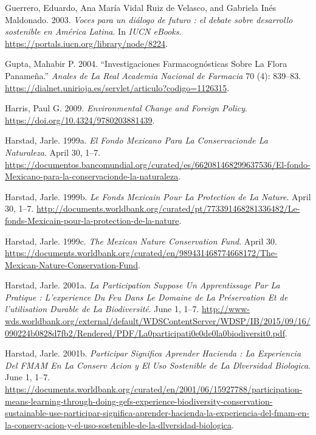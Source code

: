 \begin{CSLReferences}{1}{1}
Guerrero, Eduardo, Ana María Vidal Ruiz de Velasco, and Gabriela Inés
Maldonado. 2003. \emph{Voces para un diálogo de futuro : el debate sobre
desarrollo sostenible en América Latina}. In \emph{IUCN eBooks}.
\url{https://portals.iucn.org/library/node/8224}.

Gupta, Mahabir P. 2004. {``Investigaciones Farmacognósticas Sobre La
Flora Panameña.''} \emph{Anales de La Real Academia Nacional de
Farmacia} 70 (4): 839--83.
\url{https://dialnet.unirioja.es/servlet/articulo?codigo=1126315}.

Harris, Paul G. 2009. \emph{Environmental Change and Foreign Policy}.
\url{https://doi.org/10.4324/9780203881439}.

Harstad, Jarle. 1999a. \emph{El Fondo Mexicano Para La Conservacionde La
Naturaleza}. April 30, 1--7.
\url{https://documentos.bancomundial.org/curated/es/662081468299637536/El-fondo-Mexicano-para-la-conservacionde-la-naturaleza}.

Harstad, Jarle. 1999b. \emph{Le Fonds Mexicain Pour La Protection de La
Nature}. April 30, 1--7.
\url{http://documents.worldbank.org/curated/pt/773391468281336482/Le-fonds-Mexicain-pour-la-protection-de-la-nature}.

Harstad, Jarle. 1999c. \emph{The Mexican Nature Conservation Fund}.
April 30.
\url{https://documents.worldbank.org/curated/en/989431468774668172/The-Mexican-Nature-Conservation-Fund}.

Harstad, Jarle. 2001a. \emph{La Participation Suppose Un Apprentissage
Par La Pratique : L'experience Du Feu Dans Le Domaine de La Préservation
Et de l'utilisation Durable de La Biodiversité}. June 1, 1--7.
\url{http://www-wds.worldbank.org/external/default/WDSContentServer/WDSP/IB/2015/09/16/090224b0828d7fb2/Rendered/PDF/La0participati0e0de0la0biodiversit0.pdf}.

Harstad, Jarle. 2001b. \emph{Participar Significa Aprender Hacienda : La
Experiencia Del FMAM En La Conserv Acion y El Uso Sostenible de La
Dlversidad Biologica}. June 1, 1--7.
\url{https://documents.worldbank.org/curated/en/2001/06/15927788/participation-means-learning-through-doing-gefs-experience-biodiversity-conservation-sustainable-use-participar-significa-aprender-hacienda-la-experiencia-del-fmam-en-la-conserv-acion-y-el-uso-sostenible-de-la-dlversidad-biologica}.


\end{CSLReferences}
